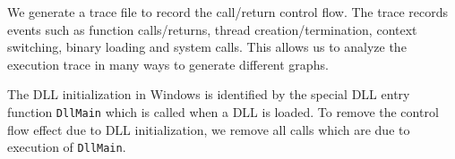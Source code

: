 We generate a trace file to record the call/return control flow.
The trace records events such as function calls/returns,
thread creation/termination, context switching, binary loading
and system calls.
This allows us to analyze the execution trace in many ways to generate
different graphs.

The DLL initialization in Windows is identified by the special
DLL entry function {\tt DllMain} which is called when a DLL is loaded.
To remove the control flow effect due to DLL initialization,
we remove all calls which are due to execution of {\tt DllMain}.
